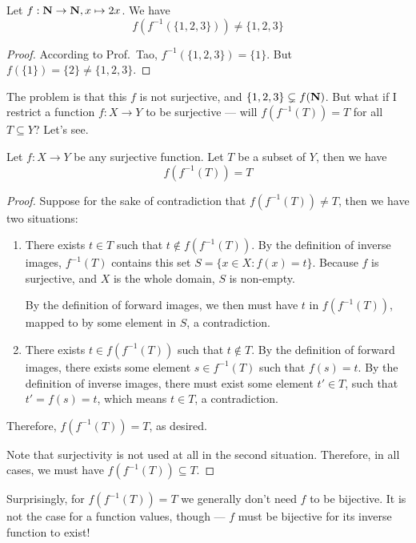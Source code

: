 \begin{why}{48}\label{why.func.image.surj}
	Let $f: \mathbf{N} \to \mathbf{N}, x \mapsto 2x$. We have
	\[
	f(f^{-1}(\{1,2,3\})) \ne \{1,2,3\}
	\]
\end{why}
\begin{proof}
	According to Prof.~Tao, $f^{-1}(\{1,2,3\}) = \{1\}$. But $f(\{1\}) = \{2\} \ne \{1,2,3\}$. 
\end{proof}

The problem is that this $f$ is not surjective, and $\{1,2,3\} \subsetneq f(\mathbf{N})$. But what if I restrict a function $f: X \to Y$ to be surjective --- will $f(f^{-1}(T)) = T$ for all $T \subseteq Y$? Let's see.

\begin{prop}\label{my.surj.image.prop}
	Let $f: X \to Y$ be any surjective function. Let $T$ be a subset of $Y$, then we have
	\[
		f(f^{-1}(T)) = T
	\]
\end{prop}
\begin{proof}
	Suppose for the sake of contradiction that $f(f^{-1}(T)) \ne T$, then we have two situations:
	\begin{enumerate}
		\item There exists $t \in T$ such that $t \notin f(f^{-1}(T))$. By the definition of inverse images, $f^{-1}(T)$ contains this set $S = \{x \in X: f(x) = t\}$. Because $f$ is surjective, and $X$ is the whole domain, $S$ is non-empty. 
		
		By the definition of forward images, we then must have $t$ in $f(f^{-1}(T))$, mapped to by some element in $S$, a contradiction.
		
		\item There exists $t \in f(f^{-1}(T))$ such that $t \notin T$. By the definition of forward images, there exists some element $s \in f^{-1}(T)$ such that $f(s) = t$. By the definition of inverse images, there must exist some element $t' \in T$, such that $t' = f(s) = t$, which means $t \in T$, a contradiction.
	\end{enumerate}
	Therefore, $f(f^{-1}(T)) = T$, as desired.
	
	Note that surjectivity is not used at all in the second situation. Therefore, in all cases, we must have $f(f^{-1}(T)) \subseteq T$.
\end{proof}

Surprisingly, for $f(f^{-1}(T)) = T$ we generally don't need $f$ to be bijective. It is not the case for a function values, though --- $f$ must be bijective for its inverse function to exist!

